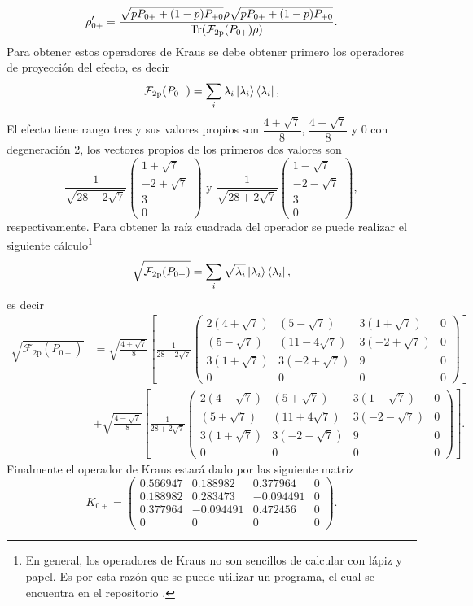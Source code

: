 \[\rho'_{0+}=\dfrac{\sqrt{p P_{0+}+(1-p)P_{+0}}\rho\sqrt{p P_{0+}+(1-p)P_{+0} }}{{\rm Tr}(\mathcal{F}_{2\text{p}}(P_{0+})\rho)}.\]  Para obtener estos operadores de Kraus se debe obtener primero los operadores de proyección del efecto, es decir \[\mathcal{F}_{2\text{p}}(P_{0+})= \sum_i \lambda_i \ket{\lambda_i}\bra{\lambda_i},\] El efecto tiene rango tres y sus valores propios son $\dfrac{4+\sqrt{7}}{8}$, $\dfrac{4-\sqrt{7}}{8}$ y $0$ con degeneración 2,  los vectores propios de los primeros dos valores son\[\frac{1}{\sqrt{28 - 2 \sqrt{7} }}\begin{pmatrix}1 + \sqrt{7}\\-2 + \sqrt{7}\\ 3\\0 \end{pmatrix} \text{ y } \frac{1}{\sqrt{28 + 2 \sqrt{7} }}\begin{pmatrix}1 - \sqrt{7}\\-2 - \sqrt{7}\\ 3\\0 \end{pmatrix},\] respectivamente. Para obtener la raíz cuadrada del operador se puede realizar el siguiente cálculo\footnote[2]{En general, los operadores de Kraus no son sencillos de calcular con lápiz y papel. Es por esta razón que se puede utilizar un programa, el cual se encuentra en el repositorio {\cite{enlacepropio}}.} \[\sqrt{\mathcal{F}_{2\text{p}}(P_{0+})}=\sum_i \sqrt{\lambda_i} \ket{\lambda_i}\bra{\lambda_i},\] es decir \[\begin{split}\sqrt{\mathcal{F}_{2\text{p}}(P_{0+})}&=\sqrt{\frac{4+\sqrt{7}}{8}} \left[\frac{1}{28-2\sqrt{7}} \begin{pmatrix}
    2(4+\sqrt{7}) & (5-\sqrt{7}) &  3(1+\sqrt{7}) &  0\\
    (5-\sqrt{7}) &  (11-4\sqrt{7}) &  3(-2+\sqrt{7}) &  0\\
    3(1+\sqrt{7})  &  3(-2+\sqrt{7})  &  9 &  0\\
    0&  0&  0&  0
  \end{pmatrix}\right]\\&+ \sqrt{\frac{4-\sqrt{7}}{8}}\left[ \frac{1}{28+2\sqrt{7}} \begin{pmatrix}
    2(4-\sqrt{7}) & (5+\sqrt{7}) &  3(1-\sqrt{7}) &  0\\
    (5+\sqrt{7}) &  (11+4\sqrt{7}) &  3(-2-\sqrt{7}) &  0\\
    3(1+\sqrt{7})  &  3(-2-\sqrt{7})  &  9 &  0\\
    0&  0&  0&  0
  \end{pmatrix}\right]. \end{split}\]Finalmente el operador de Kraus estará dado por las siguiente matriz \[K_{0+}=\begin{pmatrix}
    0.566947& 0.188982& 0.377964& 0\\
    0.188982 &  0.283473& -0.094491 &  0\\
    0.377964 & -0.094491  &  0.472456 &  0\\
    0 &  0&  0 &  0
  \end{pmatrix}.\] 

